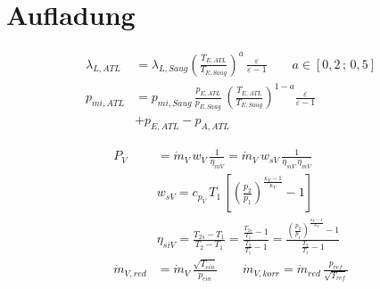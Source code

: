 \documentclass[english,threecolumn,color]{latex4ei/latex4ei_sheet}
\begin{document}
\section{Aufladung}
\begin{sectionbox}

	\begin{align*}
	\lambda_{L,ATL}&=\lambda_{L,Saug} \left( \frac{T_{E,ATL}}{T_{E,Saug}}\right)^a \, \frac{\varepsilon}{\varepsilon-1} \qquad  a\in [0,2 \,;\, 0,5]\\
	p_{mi,ATL}&=p_{mi,Saug} \, \frac{p_{E,ATL}}{p_{E,Saug}} \, \left( \frac{T_{E,ATL}}{T_{E,Saug}} \right)^{1-a}  \frac{\varepsilon}{\varepsilon-1}\\
	& +p_{E,ATL}-p_{A,ATL}
	\end{align*}
\end{sectionbox}
\begin{sectionbox}

	\begin{align*}
		P_V&=\dot{m}_V \, w_V \, \frac{1}{\eta_{mV}} = \dot{m}_V \, w_{sV} \, \frac{1}{\eta_{siV}\,\eta_{mV}}\\
		&w_{sV}=c_{p_V}\,T_1 \, \left[ \left( \frac{p_2}{p_1} \right)^{\frac{\kappa_V-1}{\kappa_V}} -1 \right]\\
		&\eta_{siV}=\frac{T_{2s} -T_1}{T_2 -T_1}=\frac{\frac{T_{2s}}{T_1} -1}{\frac{T_{2}}{T_1} -1} = \frac{\left( \frac{p_{2}}{p_1}\right)^{\frac{\kappa_V-1}{\kappa_V}} -1}{\frac{T_{2}}{T_1} -1}\\
		\dot{m}_{V,red}&=\dot{m}_V \, \frac{\sqrt{T_{ein}}}{p_{ein}} \qquad \dot{m}_{V,korr}=\dot{m}_{red} \, \frac{p_{ref}}{\sqrt{T_{ref}}}
	\end{align*}
\end{sectionbox}
\end{document}
